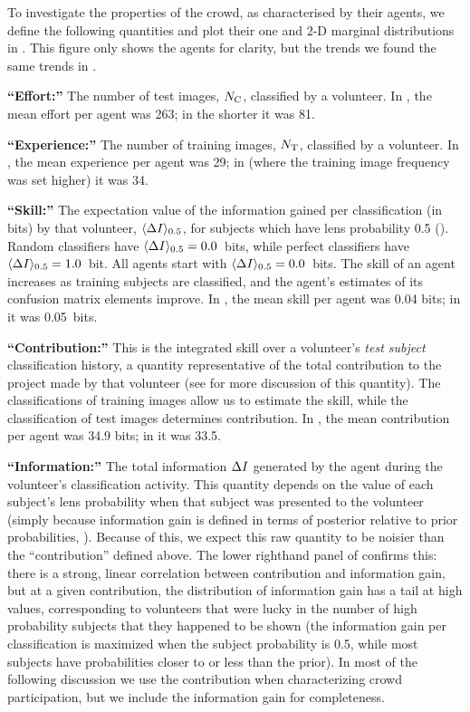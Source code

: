 \documentclass[useAMS,usenatbib,a4paper]{mn2e}
\begin{document}
To investigate the properties of the \sw crowd, as characterised by their
agents, we define the following quantities and plot their one and 2-D marginal
distributions in
. This figure only shows the \StageOne agents for clarity,
but the trends we found the same trends in \StageTwo.
%
\begin{description}
%
\item{\noindent\bf ``Effort:''} The number of test images, $N_{\rm C}$, classified
by a volunteer. In \StageOne, the mean effort per agent was 263; in the shorter
\StageTwo it was 81.
%
\item{\noindent\bf ``Experience:''} The number of training images, $N_{\rm T}$,
classified by a volunteer. In \StageOne, the mean experience per agent was 29;
in \StageTwo (where the training image frequency was set higher) it was 34.
%
\item{\noindent\bf ``Skill:''} The expectation value of the information gained
per classification (in bits) by that volunteer,  ${\langle \Delta I \rangle_{0.5}}$, for subjects which
have lens probability 0.5 (). Random classifiers have
${\langle \Delta I \rangle_{0.5}} = 0.0$~bits, while perfect classifiers have ${\langle \Delta I \rangle_{0.5}} = 1.0$~bit.
All agents start
with ${\langle \Delta I \rangle_{0.5}} = 0.0$~bits. The skill of  an agent increases as training subjects are
classified, and the agent's estimates of its confusion matrix elements improve.
In \StageOne, the mean skill per agent was 0.04 bits; in  \StageTwo it was
0.05~bits.
%
\item{\noindent\bf ``Contribution:''} This is the integrated skill over a volunteer's
{\it test subject} classification history, a quantity representative of the
total contribution to the project made by that volunteer (see  for
more discussion of this quantity). The classifications of training images
allow us to estimate the skill, while the classification of test images determines
contribution.  In \StageOne, the mean  contribution per agent was
34.9 bits; in \StageTwo it was 33.5.
%
\item{\noindent\bf ``Information:''} The total information $\Delta I$
generated by the agent during the volunteer's classification activity. This
quantity depends on the value of each subject's lens probability when that
subject was presented to the volunteer (simply because information gain is
defined in terms of posterior relative to prior probabilities,
).  Because of this, we expect this raw quantity to be noisier
than the ``contribution'' defined above. The lower righthand panel of
 confirms this: there is a strong, linear correlation
between contribution and information gain, but at a given contribution, the
distribution of information gain has a tail at high values, corresponding to
volunteers that were lucky in the number of high probability subjects that they
happened to be shown (the information gain per classification is maximized when the
subject probability is 0.5, while most subjects have probabilities closer to or less than the prior).
In most of the following discussion we use the contribution when characterizing
crowd participation, but we include
the information gain for completeness.
%
\end{description}
\end{document}

